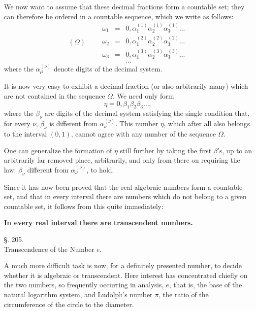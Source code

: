 \documentclass[11pt]{article}
\begin{document}
We now want to assume that these decimal fractions form a countable set; they can therefore be ordered in a countable sequence, which we write as follows:
\[
(\Omega)\qquad
\begin{array}{rcl}
\omega_1&=&0,\alpha_1^{(1)}\alpha_2^{(1)}\alpha_3^{(1)}\ldots\\
\omega_2&=&0,\alpha_1^{(2)}\alpha_2^{(2)}\alpha_3^{(2)}\ldots\\
\omega_3&=&0,\alpha_1^{(3)}\alpha_2^{(3)}\alpha_3^{(3)}\ldots\\
&&\ldots
\end{array}
\]
where the $\alpha_\mu^{(\nu)}$ denote digits of the decimal system.

It is now very easy to exhibit a decimal fraction (or also arbitrarily many) which are not contained in the sequence $\Omega$. We need only form
\[
\eta=0,\beta_1\beta_2\beta_3\ldots,
\]
where the $\beta_\nu$ are digits of the decimal system satisfying the single condition that, for every $\nu$, $\beta_\nu$ is different from $\alpha_\nu^{(\nu)}$.
This number $\eta$, which after all also belongs to the interval $(0,1)$, cannot agree with any number of the sequence $\Omega$.

One can generalize the formation of $\eta$ still further by taking the first $\beta$'s, up to an arbitrarily far removed place, arbitrarily, and only from there on requiring the law: $\beta_\nu$ different from $\alpha_\nu^{(\nu)}$, to hold.

Since it has now been proved that the real algebraic numbers form a countable set, and that in every interval there are numbers which do not belong to a given countable set, it follows from this quite immediately:

\begin{center}
\textbf{In every real interval there are transcendent numbers.}
\end{center}

\begin{center}
{\large §. 205.}\\[0.4em]
{\large Transcendence of the Number $e$.}
\end{center}

A much more difficult task is now, for a definitely presented number, to decide whether it is algebraic or transcendent. Here interest has concentrated chiefly on the two numbers, so frequently occurring in analysis, $e$, that is, the base of the natural logarithm system, and Ludolph's number $\pi$, the ratio of the circumference of the circle to the diameter.
\end{document}
